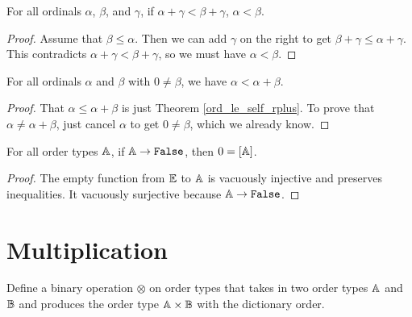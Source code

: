\documentclass[../../math.tex]{subfiles}
\begin{document}
\begin{theorem} \label{ord_lt_plus_rcancel}
    For all ordinals $\alpha$, $\beta$, and $\gamma$, if $\alpha + \gamma <
    \beta + \gamma$, $\alpha < \beta$.
\end{theorem}
\begin{proof}
    Assume that $\beta \leq \alpha$.  Then we can add $\gamma$ on the right to
    get $\beta + \gamma \leq \alpha + \gamma$.  This contradicts $\alpha +
    \gamma < \beta + \gamma$, so we must have $\alpha < \beta$.
\end{proof}

\begin{theorem} \label{ord_lt_self_rplus}
    For all ordinals $\alpha$ and $\beta$ with $0 \neq \beta$, we have $\alpha <
    \alpha + \beta$.
\end{theorem}
\begin{proof}
    That $\alpha \leq \alpha + \beta$ is just Theorem \ref{ord_le_self_rplus}.
    To prove that $\alpha \neq \alpha + \beta$, just cancel $\alpha$ to get $0
    \neq \beta$, which we already know.
\end{proof}

\begin{theorem} \label{ord_false_0}
    For all order types $\mathbb{A}$, if $\A \to \verb|False|$, then $0 = [\mathbb{A}]$.
\end{theorem}
\begin{proof}
    The empty function from $\mathbb{E}$ to $\mathbb{A}$ is vacuously injective and preserves
    inequalities.  It vacuously surjective because $\A \to \verb|False|$.
\end{proof}

\section{Multiplication}

\begin{definition}
    Define a binary operation $\otimes$ on order types that takes in two order
    types $\mathbb{A}$ and $\mathbb{B}$ and produces the order type $\mathbb{A} \times \mathbb{B}$ with the
    dictionary order.
\end{definition}
\end{document}
